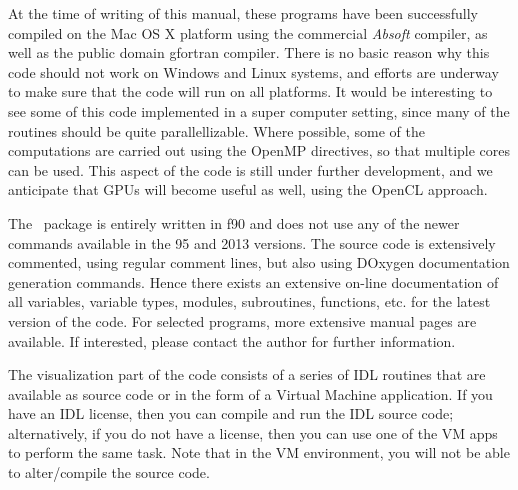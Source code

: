 At the time of writing of this manual, these programs have been successfully compiled on the Mac OS X platform using the commercial \textit{Absoft} compiler,
as well as the public domain gfortran compiler.  There is no basic reason why this code should not work on Windows and Linux systems, and efforts are underway
to make sure that the code will run on all platforms. It would be interesting to see some of this code
implemented in a super computer setting, since many of the routines should be quite parallellizable.  Where possible, some of the computations
are carried out using the OpenMP directives, so that multiple cores can be used.  This aspect of the code is still under further development,
and we anticipate that GPUs will become useful as well, using the OpenCL approach.

The \ctp\ package is entirely written in f90 and does not use any of the newer commands available in the 95 and 2013 versions.
The source code is extensively commented, using regular comment lines, but also using DOxygen documentation generation commands.  Hence
there exists an extensive on-line documentation of all variables, variable types, modules, subroutines, functions, etc. for the latest version 
of the code.  For selected programs, more extensive manual pages are available.  If interested, please contact the author for further information.

The visualization part of the code consists of a series of  IDL routines that are available as source code or in the form of a Virtual Machine application. 
If you have an IDL license, then you can compile and run the IDL source code; alternatively, if you do not have a license,
then you can use one of the VM apps to perform the same task.  Note that in the VM environment, you will not be able to alter/compile the 
source code.